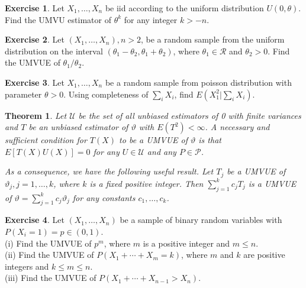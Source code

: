 \documentclass{article}
\newtheorem*{theorem*}{Theorem}
\theoremstyle{definition}
\newtheorem*{exercise*}{Exercise}
\begin{document}
	\begin{exercise*}
		Let $X_1, \ldots, X_n$ be iid according to the uniform distribution $U(0,\theta)$. Find the UMVU estimator of $\theta^k$ for any integer $k>-n$.
	\end{exercise*}
	 
	\begin{exercise*}
	Let $\left(X_1, \ldots, X_n\right), n>2$, be a random sample from the uniform distribution on the interval $\left(\theta_1-\theta_2, \theta_1+\theta_2\right)$, where $\theta_1 \in \mathcal{R}$ and $\theta_2>0$. Find the UMVUE of $\theta_1 / \theta_2$.
	\end{exercise*}
	
	\begin{exercise*}
		 Let $X_1,\dots,X_n$ be a random sample from poisson distribution with parameter $\theta > 0$. Using completeness of $\sum_{i}X_i$, find $E(X_1^2|\sum_{i}X_i)$.
	\end{exercise*}
	
		\begin{theorem*}
		Let $\mathcal{U}$ be the set of all unbiased estimators of 0 with finite variances and $T$ be an unbiased estimator of $\vartheta$ with $E\left(T^2\right)<\infty$. A necessary and sufficient condition for $T(X)$ to be a UMVUE of $\vartheta$ is that $E[T(X) U(X)]=0$ for any $U \in \mathcal{U}$ and any $P \in \mathcal{P}$.
		
		As a consequence, we have the following useful result. Let $T_j$ be a UMVUE of $\vartheta_j, j=1, \ldots, k$, where $k$ is a fixed positive integer. Then $\sum_{j=1}^k c_j T_j$ is a UMVUE of $\vartheta=\sum_{j=1}^k c_j \vartheta_j$ for any constants $c_1, \ldots, c_k$.
	\end{theorem*}
	
	\begin{exercise*}
		Let $\left(X_1, \ldots, X_n\right)$ be a sample of binary random variables with $P\left(X_i=1\right)=p \in(0,1)$.\\
		(i) Find the UMVUE of $p^m$, where $m$ is a positive integer and $m \leq n$.\\
		(ii) Find the UMVUE of $P\left(X_1+\cdots+X_m=k\right)$, where $m$ and $k$ are positive integers and $k \leq m \leq n$.\\
		(iii) Find the UMVUE of $P\left(X_1+\cdots+X_{n-1}>X_n\right)$.
	\end{exercise*}
	
\end{document}
